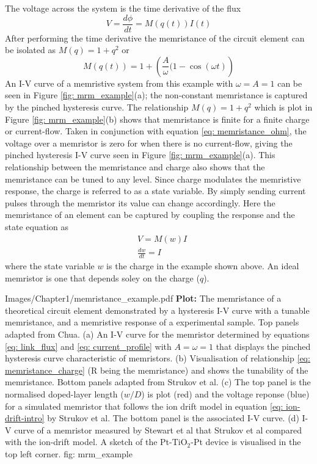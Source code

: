 The voltage across the system is the time derivative of the flux
\begin{equation}
V = \frac{d \phi}{dt} = M(q(t)) I(t)
\end{equation}
After performing the time derivative the memristance of the circuit element can be isolated as $M(q) = 1 + q^2$ or 
\begin{equation}
M(q(t)) = 1 + \left( \frac{A}{\omega}( 1- \cos(\omega t) \right)
\label{eq: memristance_charge}
\end{equation}
An I-V curve of a memristive system from this example with $\omega = A = 1$ can be seen in Figure \ref{fig: mrm_example}(a); the non-constant memristance is captured by the pinched hysteresis curve. The relationship $M(q) = 1 + q^2$ which is plot in Figure \ref{fig: mrm_example}(b) shows that memristance is finite for a finite charge or current-flow. Taken in conjunction with equation \ref{eq: memristance_ohm}, the voltage over a memristor is zero for when there is no current-flow, giving the pinched hysteresis I-V curve seen in Figure \ref{fig: mrm_example}(a). This relationship between the memristance and charge also shows that the memristance can be tuned to any level\cite{chua2011}. Since charge modulates the memristive response, the charge is referred to as a state variable. By simply sending current pulses through the memristor its value can change accordingly. Here the memristance of an element can be captured by coupling the response and the state equation as
\begin{align}
&V = M(w) I\\
&\frac{dw}{dt} = I
\end{align}
where the state variable $w$ is the charge in the example shown above. An ideal memristor is one that depends soley on the charge ($q$).

{Images/Chapter1/memristance_example.pdf}
{\textbf{Plot:} The memristance of a theoretical circuit element demonstrated by a hysteresis I-V curve with a tunable memristance, and a memristive response of a experimental sample. }
{Top panels adapted from Chua\cite{chua2011}. (a) An I-V curve for the memristor determined by equations \ref{eq: link_flux} and \ref{eq: current_profile} with $A = \omega = 1$ that displays the pinched hysteresis curve characteristic of memristors. (b) Visualisation of relationship \ref{eq: memristance_charge} (R being the memristance) and shows the tunability of the memristance. Bottom panels adapted from Strukov et al\cite{strukov2008}. (c) The top panel is the normalised doped-layer length ($w/D$) is plot (red) and the voltage reponse (blue) for a simulated memristor that follows the ion drift model in equation \ref{eq: ion-drift-intro} by Strukov et al\cite{strukov2008}. The bottom panel is the associated I-V curve. (d) I-V curve of a memristor measured by Stewart et al\cite{stewart2004} that Strukov et al compared with the ion-drift model\cite{strukov2008}. A sketch of the Pt-TiO$_2$-Pt device is visualised in the top left corner.}
{fig: mrm_example}


